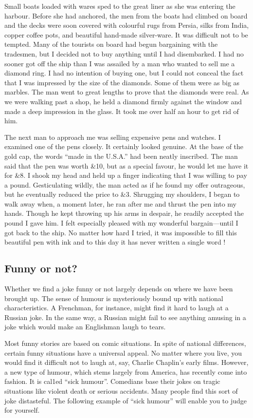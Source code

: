 \documentclass[11pt]{article}
\begin{document}
Small boats loaded with wares sped to the great liner as she was entering the harbour. Before she had anchored, the men from the boats had climbed on board and the decks were soon covered with colourful rugs from Persia, silks from India, copper coffee pots, and beautiful hand-made silver-ware. It was difficult not to be tempted. Many of the tourists on board had begun bargaining with the tradesmen, but I decided not to buy anything until I had disembarked. I had no sooner got off the ship than I was assailed by a man who wanted to sell me a diamond ring. I had no intention of buying one, but I could not conceal the fact that I was impressed by the size of the diamonds. Some of them were as big as marbles. The man went to great lengths to prove that the diamonds were real. As we were walking past a shop, he held a diamond firmly against the window and made a deep impression in the glass. It took me over half an hour to get rid of him.

The next man to approach me was selling expensive pens and watches. I examined one of the pens closely. It certainly looked genuine. At the base of the gold cap, the words ``made in the U.S.A.'' had been neatly inscribed. The man said that the pen was worth \&10, but as a special favour, he would let me have it for \&8. I shook my head and held up a finger indicating that I was willing to pay a pound. Gesticulating wildly, the man acted as if he found my offer outrageous, but he eventually reduced the price to \&3. Shrugging my shoulders, I began to walk away when, a moment later, he ran after me and thrust the pen into my hands. Though he kept throwing up his arms in despair, he readily accepted the pound I gave him. I felt especially pleased with my wonderful bargain---until I got back to the ship. No matter how hard I tried, it was impossible to fill this beautiful pen with ink and to this day it has never written a single word !
\subsection{Funny or not?}
\label{sec-1-29}

Whether we find a joke funny or not largely depends on where we have been brought up. The sense of humour is mysteriously bound up with national characteristics. A Frenchman, for instance, might find it hard to laugh at a Russian joke. In the same way, a Russian might fail to see anything amusing in a joke which would make an Englishman laugh to tears. 

Most funny stories are based on comic situations. In spite of national differences, certain funny situations have a universal appeal. No matter where you live, you would find it difficult not to laugh at, say, Charlie Chaplin's early films. However, a new type of humour, which stems largely from America, has recently come into fashion. It is cal1ed ``sick humour''. Comedians base their jokes on tragic situations like violent death or serious accidents. Many people find this sort of joke distasteful. The following example of ``sick humour'' will enable you to judge for yourself. 
\end{document}
